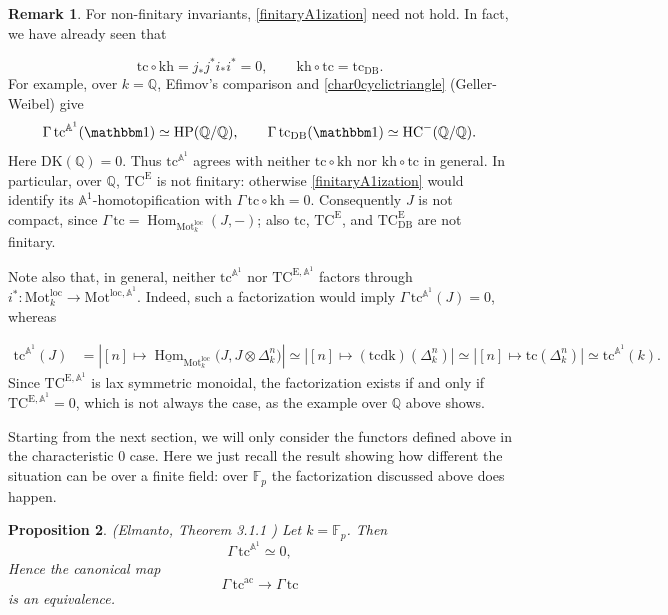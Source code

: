 \documentclass{amsart}
\theoremstyle{plain}
\newtheorem{prop}{Proposition}[section]
\theoremstyle{definition}
\newtheorem{remark}[prop]{Remark}
\newcommand{\ra}{\rightarrow}
\newcommand{\bbA}{\mathbb{A}}
\newcommand{\bbF}{\mathbb{F}}
\newcommand{\bbQ}{\mathbb{Q}}
\newcommand{\Motloc}{\mathrm{Mot}^{\mathrm{loc}}}
\newcommand{\MotlocA}{\mathrm{Mot}^{\mathrm{loc},\mathbb A^1}}
\newcommand{\TC}{\mathrm{TC}}
\newcommand{\HC}{\mathrm{HC}}
\newcommand{\HP}{\mathrm{HP}}
\newcommand{\DK}{\mathrm{DK}}
\newcommand{\dk}{\mathrm{dk}}
\newcommand{\kh}{\mathrm{kh}}
\newcommand{\tc}{\mathrm{tc}}
\DeclareMathOperator{\Hom}{Hom}
\newcommand{\DB}{\mathrm{DB}}
\begin{document}
\begin{remark}\label{nonfinitarity}
For non-finitary invariants, \eqref{finitaryA1ization}
need not hold. In fact, we have already seen that

\[
\tc\circ \kh=j_*j^*i_*i^*=0,
\qquad
\kh\circ \tc=\tc_{\DB}.
\]
For example, over $k=\bbQ$, Efimov's comparison and
\ref{char0cyclictriangle} (Geller-Weibel) give
\[
\Gamma\,\tc^{\bbA^1}(\mathbbm1)\simeq \HP(\bbQ/\bbQ),
\qquad
\Gamma\,\tc_{\DB}(\mathbbm1)\simeq \HC^-(\bbQ/\bbQ).
\]
Here $\DK(\bbQ)=0$.
Thus $\tc^{\bbA^1}$ agrees with neither $\tc\circ \kh$
nor $\kh\circ \tc$ in general. In particular, over $\bbQ$,
$\TC^{\mathrm{E}}$ is not finitary: otherwise
\eqref{finitaryA1ization} would identify its
$\bbA^1$-homotopification with $\Gamma\,\tc\circ \kh=0$.
Consequently $J$ is not compact, since
$\Gamma\,\tc=\Hom_{\Motloc_k}(J,-)$; also $\tc$, $\TC^{\mathrm{E}}$, and
$\TC^{\mathrm{E}}_{\DB}$ are not finitary.



Note also that, in general, neither $\tc^{\bbA^1}$ nor
$\TC^{\mathrm{E},\bbA^1}$ factors through
$i^*:\Motloc_k\ra\MotlocA$.
Indeed, such a factorization would imply
$\Gamma\,\tc^{\bbA^1}(J)=0$, whereas




\begin{align}
    \tc^{\bbA^1}(J)
&=|[n]\longmapsto
\underline{\Hom}_{\Motloc_k}
\bigl(J,J\otimes\Delta_k^n\bigr)|\simeq |[n]\longmapsto
(\tc \dk)(\Delta_k^n)|\simeq |[n]\longmapsto
\tc(\Delta_k^n)|\simeq \tc^{\bbA^1}(k).
\end{align}
Since $\TC^{\mathrm{E}, \bbA^1}$ is lax symmetric monoidal, the factorization exists if and only if $\TC^{\mathrm{E}, \bbA^1}=0$, which is not always the case, as the example over $\bbQ$
above shows.

\end{remark}



Starting from the next section, we will only consider the functors defined above in the characteristic 0 case. Here we just recall the result showing how different the situation can be over a finite field: over $\bbF_p$ the factorization discussed above does happen.

\begin{prop}\label{FpA1} (Elmanto, Theorem 3.1.1 \cite{Elm20})
Let $k=\bbF_p$.  Then
\[
\Gamma\,\tc^{\bbA^1}\simeq0,
\]
Hence the canonical map
\[
\Gamma\,\tc^{\mathrm{ac}}\longrightarrow\Gamma\,\tc
\]
is an equivalence.
\end{prop}
\end{document}

